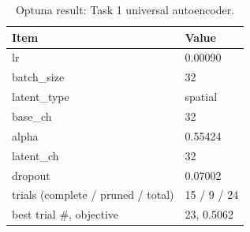 \begin{table}[t]
\centering
\caption{Optuna result: Task 1 universal autoencoder.}
\label{tab:optuna_ae_universal_best}
\footnotesize
\begin{tabular}{ll}
\toprule
Item & Value \\
\midrule
lr & 0.00090 \\
batch\_size & 32 \\
latent\_type & spatial \\
base\_ch & 32 \\
alpha & 0.55424 \\
latent\_ch & 32 \\
dropout & 0.07002 \\
trials (complete / pruned / total) & 15 / 9 / 24 \\
best trial \#, objective & 23, 0.5062 \\
\bottomrule
\end{tabular}
\end{table}
